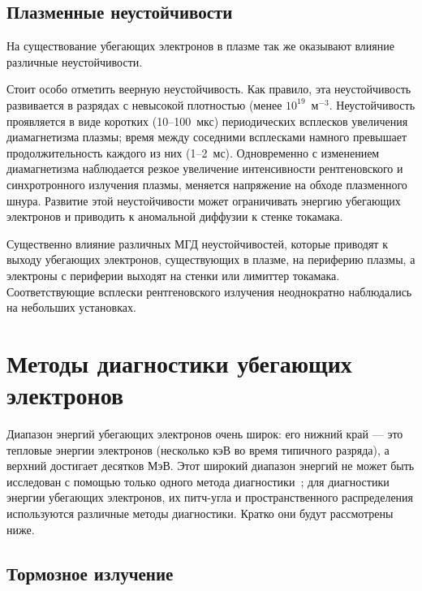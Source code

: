 
\subsection{Плазменные неустойчивости}

На существование убегающих электронов в плазме так же оказывают влияние различные неустойчивости. 

Стоит особо отметить веерную неустойчивость. Как правило, эта неустойчивость развивается в разрядах с невысокой плотностью (менее $10^{19}$~м${}^{-3}$. Неустойчивость проявляется в виде коротких (10--100~мкс) периодических всплесков увеличения диамагнетизма плазмы; время между соседними всплесками намного превышает продолжительность каждого из них (1--2~мс).  Одновременно с изменением диамагнетизма наблюдается резкое увеличение интенсивности рентгеновского и синхротронного излучения плазмы, меняется напряжение на обходе плазменного шнура. Развитие этой неустойчивости может ограничивать энергию убегающих электронов и приводить к аномальной диффузии к стенке токамака.~\cite{Parail1978,Leontovich1982}

Существенно влияние различных МГД неустойчивостей, которые приводят к выходу убегающих электронов, существующих в плазме, на периферию плазмы, а электроны с периферии выходят на стенки или лимиттер токамака. Соответствующие всплески рентгеновского излучения неоднократно наблюдались на небольших установках.~\cite{Shevelev2016,Shevelev2018}


\section{Методы диагностики убегающих электронов}

Диапазон энергий убегающих электронов очень широк: его нижний край --- это тепловые энергии электронов (несколько кэВ во время типичного разряда), а верхний достигает десятков МэВ. Этот широкий диапазон энергий не может быть исследован с помощью только одного метода диагностики~\cite{Breizman2019}; для диагностики энергии убегающих электронов, их питч-угла и пространственного распределения используются различные методы диагностики. Кратко они будут рассмотрены ниже.


\subsection{Тормозное излучение}

